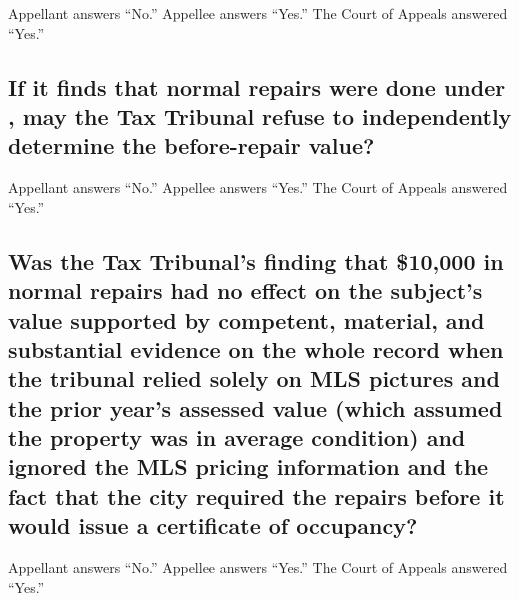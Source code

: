 \documentclass[12pt,\documentclassflag]{michiganCourtOfAppealsBrief}
\begin{document}
\noindent Appellant answers ``No.'' Appellee answers ``Yes.'' The Court of Appeals answered ``Yes.''

\subsection{If it finds that normal repairs were done under \mathieuGast, may the Tax Tribunal refuse to independently determine the before-repair value?}

\noindent Appellant answers ``No.'' Appellee answers ``Yes.'' The Court of Appeals answered ``Yes.''

\subsection{Was the Tax Tribunal's finding that \$10,000 in normal repairs had no effect on the subject's value supported by competent, material, and substantial evidence on the whole record when the tribunal relied solely on MLS pictures and the prior year's assessed value (which assumed the property was in average condition) and ignored the MLS pricing information and the fact that the city required the repairs before it would issue a certificate of occupancy?}


\noindent Appellant answers ``No.'' Appellee answers ``Yes.'' The Court of Appeals answered ``Yes.''






\end{document}
